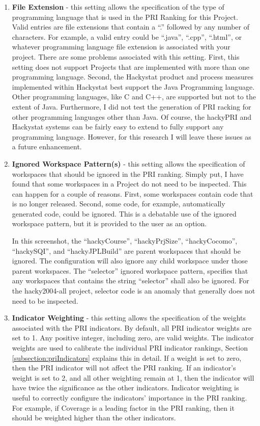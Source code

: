\begin{enumerate}
\item \textbf{File Extension} - this setting allows the specification of
  the type of programming language that is used in the PRI Ranking for this
  Project.  Valid entries are file extensions that contain a ``.'' followed
  by any number of characters. For example, a valid entry could be
  ``.java'', ``.cpp'', ``.html'', or whatever programming language file
  extension is associated with your project. There are some problems
  associated with this setting. First, this setting does not support
  Projects that are implemented with more than one programming language.
  Second, the Hackystat product and process measures implemented within
  Hackystat best support the Java Programming language. Other programming
  languages, like C and C++, are supported but not to the extent of Java.
  Furthermore, I did not test the generation of PRI racking for other
  programming languages other than Java. Of course, the hackyPRI and
  Hackystat systems can be fairly easy to extend to fully support any
  programming language.  However, for this research I will leave these
  issues as a future enhancement.
\item \textbf{Ignored Workspace Pattern(s)} - this setting allows the
  specification of workspaces that should be ignored in the PRI ranking.
  Simply put, I have found that some workspaces in a Project do not need to
  be inspected. This can happen for a couple of reasons. First, some
  workspaces contain code that is no longer released. Second, some code,
  for example, automatically generated code, could be ignored. This is a
  debatable use of the ignored workspace pattern, but it is provided to the
  user as an option.
  
  In this screenshot, the ``hackyCourse'', ``hackyPrjSize'',
  ``hackyCocomo'', ``hackySQI'', and ``hackyJPLBuild'' are parent
  workspaces that should be ignored. The configuration will also ignore any
  child workspace under those parent workspaces. The ``selector'' ignored
  workspace pattern, specifies that any workspaces that contains the string
  ``selector'' shall also be ignored. For the hacky2004-all project,
  selector code is an anomaly that generally does not need to be inspected.
\item \textbf{Indicator Weighting} - this setting allows the specification
  of the weights associated with the PRI indicators. By default, all PRI
  indicator weights are set to 1. Any positive integer, including zero, are
  valid weights. The indicator weights are used to calibrate the individual
  PRI indicator rankings, Section \ref{subsection:priIndicators} explains
  this in detail. If a weight is set to zero, then the PRI indicator will
  not affect the PRI ranking. If an indicator's weight is set to 2, and all
  other weighting remain at 1, then the indicator will have twice the
  significance as the other indicators. Indicator weighting is useful to
  correctly configure the indicators' importance in the PRI ranking. For
  example, if Coverage is a leading factor in the PRI ranking, then it
  should be weighted higher than the other indicators.
\end{enumerate}


